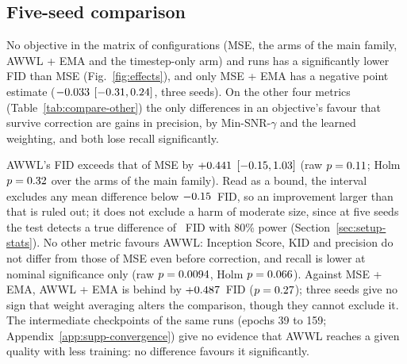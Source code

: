 \subsection{Five-seed comparison}
\label{sec:compare}


No objective in the matrix of \nArmsMatrix{} configurations (MSE, the
\nFamilyMain{} arms of the main family, AWWL + EMA and the timestep-only arm)
and \nRunsMatrix{} runs has a significantly lower FID than MSE
(Fig.~\ref{fig:effects}), and only MSE + EMA has a negative point estimate
($-0.033$ $[-0.31, 0.24]$, three seeds). On the other four
metrics (Table~\ref{tab:compare-other}) the only differences in an
objective's favour that survive correction are gains in precision, by
Min-SNR-$\gamma$ and the learned weighting, and both lose recall
significantly.

AWWL's FID exceeds that of MSE by $+0.441$ $[-0.15, 1.03]$ (raw
$p = 0.11$; Holm $p = 0.32$ over the \nFamilyMain{} arms of the main
family). Read as a bound, the interval excludes any mean difference below
$-0.15$~FID, so an improvement larger than that is ruled out; it does not
exclude a harm of moderate size, since at five seeds the test detects a true
difference of \mdeAWWL~FID with 80\% power (Section~\ref{sec:setup-stats}). No
other metric favours AWWL: Inception Score, KID and precision do not differ
from those of MSE even before correction, and recall is lower at nominal
significance only (raw $p = 0.0094$, Holm $p = 0.066$). Against
MSE + EMA, AWWL + EMA is behind by $+0.487$~FID ($p = 0.27$);
three seeds give no sign that weight averaging alters the comparison, though
they cannot exclude it. The intermediate checkpoints of the same runs (epochs 39 to 159;
Appendix~\ref{app:supp-convergence}) give no evidence that AWWL reaches a
given quality with less training: no difference favours it significantly.

